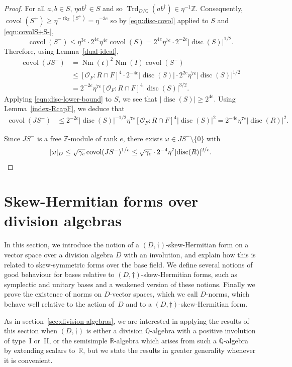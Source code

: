 \documentclass[JEP,XML,SOM,Unicode,NoFloatCountersInSection]{cedram}
\newcommand{\bQ}{\mathbb{Q}}
\newcommand{\bR}{\mathbb{R}}
\newcommand{\bZ}{\mathbb{Z}}
\newcommand{\cO}{\mathcal{O}}
\newcommand{\fc}{\mathfrak{c}}
\DeclareMathOperator{\covol}{covol}
\DeclareMathOperator{\disc}{disc}
\DeclareMathOperator{\Nm}{Nm}
\DeclareMathOperator{\rk}{rk}
\DeclareMathOperator{\Trd}{Trd}
\newcommand{\abs}[1]{\lvert #1 \rvert}
\begin{document}
\begin{proof}
For all $a,b \in S$, $\eta ab^\dag \in S$ and so $\Trd_{D/\bQ}(ab^\dag) \in \eta^{-1}\bZ$.
Consequently, $\covol(S^+) \geq \eta^{-\rk_\bZ(S^+)} = \eta^{-3e}$ so by \eqref{eqn:disc-covol} applied to $S$ and \eqref{eqn:covolS+S-},
\[
\covol(S^-) \leq \eta^{3e} \cdot 2^{4e} \eta^{4e} \covol(S) = 2^{4e} \eta^{7e} \cdot 2^{-2e} \abs{\disc(S)}^{1/2}.
\]
Therefore, using Lemma~\ref{dual-ideal},
\begin{align*}
\covol(JS^-)
& = \Nm(\fc)^2 \Nm(I) \covol(S^-)
\\& \leq [\cO_F : R \cap F]^4 \cdot 2^{-4e} \abs{\disc(S)} \cdot 2^{2e} \eta^{7e} \abs{\disc(S)}^{1/2}
\\& = 2^{-2e} \eta^{7e} [\cO_F : R \cap F]^4 \abs{\disc(S)}^{3/2}.
\end{align*}
Applying \eqref{eqn:disc-lower-bound} to $S$, we see that $\abs{\disc(S)} \geq 2^{4e}$.
Using Lemma~\ref{index-RcapF}, we deduce that
\begin{align*}
\covol(JS^-)
& \leq 2^{-2e} \abs{\disc(S)}^{-1/2} \eta^{7e} [\cO_F : R \cap F]^4 \abs{\disc(S)}^2
= 2^{-4e} \eta^{7e} \abs{\disc(R)}^2.
\end{align*}

Since $JS^-$ is a free $\bZ$-module of rank $e$, there exists $\omega \in JS^- \setminus \{0\}$ with
\[
\abs{\omega}_D \leq \sqrt{\gamma_e} \covol(JS^-)^{1/e} \leq \sqrt{\gamma_e} \cdot 2^{-4} \eta^7 \abs{\disc(R)}^{2/e}.
\qedhere
\]
\end{proof}

\section{Skew-Hermitian forms over division algebras} \label{sec:skew-hermitian}

In this section, we introduce the notion of a $(D,\dag)$-skew-Hermitian form on a vector space over a division algebra $D$ with an involution, and explain how this is related to skew-symmetric forms over the base field. We define several notions of good behaviour for bases relative to $(D,\dag)$-skew-Hermitian forms, such as symplectic and unitary bases and a weakened version of these notions. Finally we prove the existence of norms on $D$-vector spaces, which we call $D$-norms, which behave well relative to the action of~$D$ and to a $(D,\dag)$-skew-Hermitian form.

As in section~\ref{sec:division-algebras}, we are interested in applying the results of this section when $(D, \dag)$ is either a division $\bQ$-algebra with a positive involution of type~I or~II, or the semisimple $\bR$-algebra which arises from such a $\bQ$-algebra by extending scalars to~$\bR$, but we state the results in greater generality whenever it is convenient.
\end{document}
